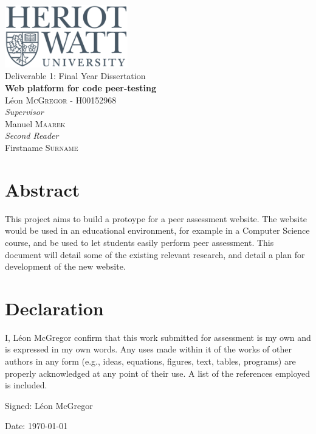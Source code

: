 \documentclass[a4paper,11pt]{report}
\newcommand{\titles}{\\\vspace{1cm}}
\begin{document}
{\centering\Large
\includegraphics[width=0.4\textwidth]{../hwu.png}\titles
Deliverable 1: Final Year Dissertation\titles
{\huge\bfseries Web platform for code peer-testing\titles}
L\'eon \textsc{McGregor} - H00152968\titles
{\large\textit{Supervisor}\\}
Manuel \textsc{Maarek}\titles
{\large\textit{Second Reader}\\}
Firstname \textsc{Surname}\\
\vfill
}

\pagebreak

\tableofcontents


\pagebreak
\doublespacing


\section*{Abstract}
This project aims to build a protoype for a peer assessment website. The website would be used in an educational environment, for example in a Computer Science course, and be used to let students easily perform peer assessment. This document will detail some of the existing relevant research, and detail a plan for development of the new website.

\vfill

\section*{Declaration}
I, L\'eon McGregor confirm that this work submitted for assessment is my own and is expressed in my own words. Any uses made within it of the works of other authors in any form (e.g., ideas, equations, figures, text, tables, programs) are properly acknowledged at any point of their use. A list of the references employed is included.\par
Signed: L\'eon McGregor\par
Date: \today

\pagebreak

\pagestyle{headings}
\end{document}
